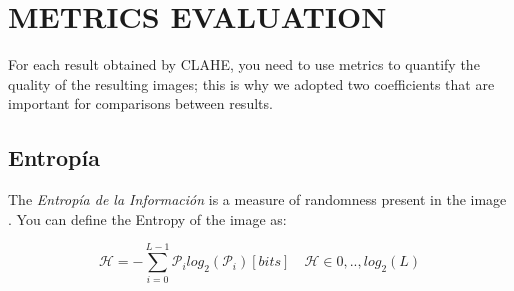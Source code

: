 \documentclass[spanish,twocolumn]{article}
\begin{document}

\section{METRICS EVALUATION}
\label{sec:metricas}

For each result obtained by CLAHE, you need to use metrics to quantify the quality of the resulting images; this is why we adopted two coefficients that are important for comparisons between results.  

\subsection{Entropía}
\label{ssec:entropia}

The {\it Entropía de la Información} is a measure of randomness present in the image \cite{tsai2008information}. You can define the Entropy of the image as:

\begin{equation}\label{eq:entropia}
\mathscr{H}=-\sum_{i=0}^{L-1}\mathcal{P}_i log_2(\mathcal{P}_i) [bits] \quad \mathscr{H} \in {0,..,log_2(L)} 
\end{equation}
\end{document}
